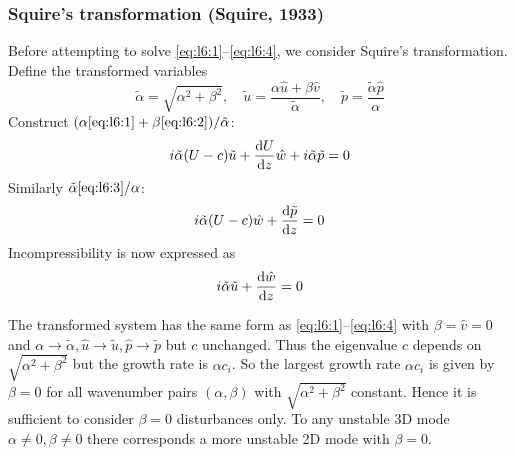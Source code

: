 \documentclass{jknotes}
\begin{document}
\subsubsection{Squire's transformation (Squire, 1933)}
Before attempting to solve \eqref{eq:l6:1}--\eqref{eq:l6:4}, we consider
Squire's transformation. Define the transformed variables
\begin{equation}
	\tilde{\alpha} = \sqrt{\alpha^2 + \beta^2},\hspace{1em} \tilde{u} =
	\frac{\alpha \hat{u} + \beta \hat{v}}{\tilde{\alpha}}, \hspace{1em}
	\tilde{p} = \frac{\tilde{\alpha}\hat{p}}{\alpha}
\end{equation}
Construct $(\alpha\eqref{eq:l6:1} + \beta\eqref{eq:l6:2})/\tilde{\alpha}$:
\begin{equation}
	i\tilde{\alpha}(U-c)\tilde{u} + \frac{\diffd  U}{\diffd z} \hat{w} +
	i\tilde{\alpha}\tilde{p} =  0\label{eq:l6:5}
\end{equation}
Similarly $\tilde{\alpha}\eqref{eq:l6:3}/\alpha$:
\begin{equation}
	i\tilde{\alpha}(U-c)\hat{w} + \frac{\diffd \tilde{p}}{\diffd z} =
	0\label{eq:l6:6}
\end{equation}
Incompressibility is now expressed as
\begin{equation}
	i\tilde{\alpha}\tilde{u}  + \frac{\diffd \hat{w}}{\diffd z} = 0
\end{equation}

The transformed system has the same form as \eqref{eq:l6:1}--\eqref{eq:l6:4}
with $\beta = \hat{v} = 0$ and $\alpha \to \tilde{\alpha},
\hat{u}\to\tilde{u}, \hat{p}\to\tilde{p}$ but $c$ unchanged. Thus the
eigenvalue $c$ depends on $\sqrt{\alpha^2+\beta^2}$ but the growth rate is
$\alpha c_i$. So the largest growth rate $\alpha c_i$ is given by $\beta = 0$
for all wavenumber pairs $(\alpha,\beta)$ with $\sqrt{\alpha^2 + \beta^2}$
constant. Hence it is sufficient to consider $\beta = 0$ disturbances only. To
any unstable 3D mode $\alpha \ne 0, \beta \ne 0$ there corresponds a more
unstable 2D mode with $\beta = 0$.
\end{document}
